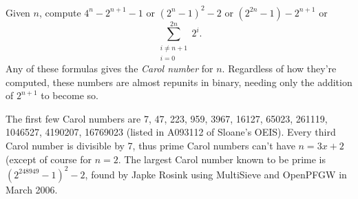 \documentclass[12pt]{article}
\begin{document}
Given $n$, compute $4^n - 2^{n + 1} - 1$ or $(2^n - 1)^2 - 2$ or $(2^{2n} - 1) - 2^{n + 1}$ or $$\sum_{\substack{i \ne n + 1\\i = 0}}^{2n} 2^i.$$ Any of these formulas gives the \emph{Carol number} for $n$. Regardless of how they're computed, these numbers are almost repunits in binary, needing only the addition of $2^{n + 1}$ to become so.

The first few Carol numbers are 7, 47, 223, 959, 3967, 16127, 65023, 261119, 1046527, 4190207, 16769023 (listed in A093112 of Sloane's OEIS). Every third Carol number is divisible by 7, thus prime Carol numbers can't have $n = 3x + 2$ (except of course for $n = 2$. The largest Carol number known to be prime is $(2^{248949} - 1)^2 - 2$, found by Japke Rosink using MultiSieve and OpenPFGW in March 2006.
\end{document}
